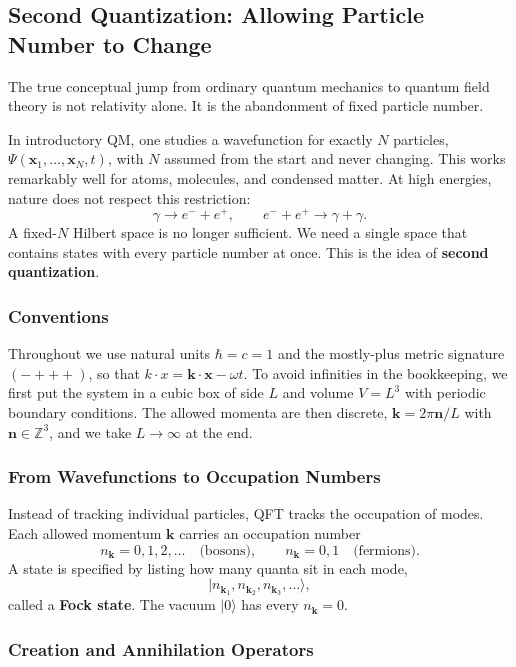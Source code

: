 \subsection*{Second Quantization: Allowing Particle Number to Change}

The true conceptual jump from ordinary quantum mechanics to quantum field
theory is not relativity alone. It is the abandonment of fixed particle number.

In introductory QM, one studies a wavefunction for exactly $N$ particles,
$\Psi(\mathbf{x}_1,\dots,\mathbf{x}_N,t)$, with $N$ assumed from the start and
never changing. This works remarkably well for atoms, molecules, and
condensed matter. At high energies, nature does not respect this restriction:
\[
\gamma \rightarrow e^- + e^+ ,
\qquad
e^- + e^+ \rightarrow \gamma + \gamma .
\]
A fixed-$N$ Hilbert space is no longer sufficient. We need a single space that
contains states with every particle number at once. This is the idea of
\textbf{second quantization}.

\subsubsection*{Conventions}

Throughout we use natural units $\hbar = c = 1$ and the mostly-plus metric
signature $(-+++)$, so that $k\cdot x = \mathbf{k}\cdot\mathbf{x} - \omega t$.
To avoid infinities in the bookkeeping, we first put the system in a cubic box
of side $L$ and volume $V = L^3$ with periodic boundary conditions. The allowed
momenta are then discrete, $\mathbf{k} = 2\pi\mathbf{n}/L$ with
$\mathbf{n}\in\mathbb{Z}^3$, and we take $L\to\infty$ at the end.

\subsubsection*{From Wavefunctions to Occupation Numbers}

Instead of tracking individual particles, QFT tracks the occupation of modes.
Each allowed momentum $\mathbf{k}$ carries an occupation number
\[
n_{\mathbf{k}} = 0,1,2,\dots \quad\text{(bosons)},
\qquad
n_{\mathbf{k}} = 0,1 \quad\text{(fermions)}.
\]
A state is specified by listing how many quanta sit in each mode,
\[
|n_{\mathbf{k}_1}, n_{\mathbf{k}_2}, n_{\mathbf{k}_3},\dots\rangle ,
\]
called a \textbf{Fock state}. The vacuum $|0\rangle$ has every $n_{\mathbf{k}}=0$.

\subsubsection*{Creation and Annihilation Operators}

